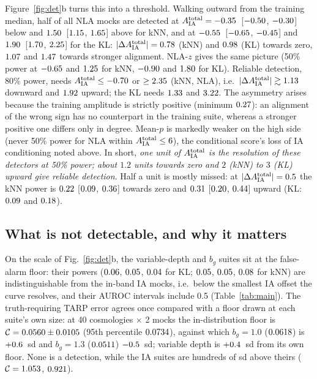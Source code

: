 \documentclass[9pt,twocolumn]{extarticle}
\newcommand{\Aia}{A_{\rm IA}^{\rm total}}
\newcommand{\dAia}{|\Delta A_{\rm IA}^{\rm total}|}
\newcommand{\bg}{b_g}
\begin{document}
Figure~\ref{fig:det}b turns this into a threshold. Walking outward from the training median, half of
all NLA mocks are detected at $\Aia=\NNlaThrKnnFiveZeroDn$~[$-0.50$,
$-0.30$] below and $1.50$~[$1.15$,
$1.65$] above for kNN, and at $-0.55$~[$-0.65$,
$-0.45$] and $1.90$~[$1.70$, $2.25$]
for the KL: $\dAia=\NNlaDthrKnnFiveZeroDn$ (kNN) and $0.98$ (KL) towards zero,
$1.07$ and $1.47$ towards stronger alignment. NLA-$z$ gives the
same picture (50\% power at $-0.65$ and $1.25$ for kNN,
$-0.90$ and $1.80$ for KL). Reliable detection, 80\% power, needs
$\Aia\le\NNlaThrKnnEightZeroDn$ or $\ge2.35$ (kNN, NLA), i.e.\
$\dAia\gtrsim\NNlaDthrKnnEightZeroDn$ downward and $1.92$ upward; the KL needs
$1.33$ and $3.22$. The asymmetry arises because the training
amplitude is strictly positive (minimum $0.27$): an alignment of the wrong sign has no
counterpart in the training suite, whereas a stronger positive one differs only in degree. Mean-$p$ is
markedly weaker on the high side (never 50\% power for NLA within $\Aia\le6$), the conditional score's
loss of IA conditioning noted above. In short, \emph{one unit of $\Aia$ is the resolution of these
detectors at 50\% power; about $1.2$ units towards zero and $2$ (kNN) to $3$ (KL) upward give reliable
detection}. Half a unit is mostly missed: at $\dAia=0.5$ the kNN power is $0.22$
[$0.09$, $0.36$] towards zero and $0.31$
[$0.20$, $0.44$] upward (KL: $0.09$ and $0.18$).



\subsection{What is not detectable, and why it matters}\label{sec:bg}
On the scale of Fig.~\ref{fig:det}b, the variable-depth and $\bg$ suites sit at the false-alarm floor:
their powers ($0.06$, $0.05$, $0.04$ for KL; $0.05$,
$0.05$, $0.08$ for kNN) are indistinguishable from the in-band IA
mocks, i.e.\ below the smallest IA offset the curve resolves, and their AUROC intervals include 0.5
(Table~\ref{tab:main}). The truth-requiring TARP error agrees
once compared with a floor drawn at each suite's own size: at 40 cosmologies $\times$ 2 mocks the
in-distribution floor is $\mathcal{C}=0.0560\pm0.0105$ (95th percentile
$0.0734$), against which $\bg=1.0$ ($0.0618$) is
$+0.6$~sd and $\bg=1.3$ ($0.0511$) $-0.5$~sd;
variable depth is $+0.4$~sd from its own floor. None is a detection, while the IA suites are
hundreds of sd above theirs ($\mathcal{C}=1.053$, $0.921$).
\end{document}

